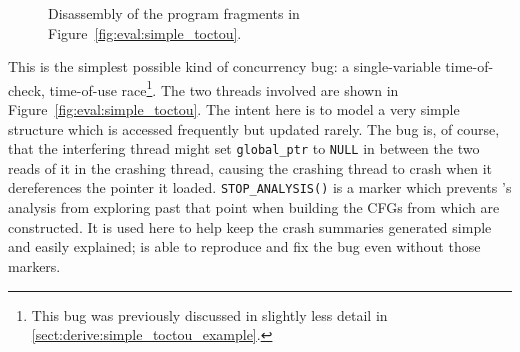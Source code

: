 \begin{figure}
  \hspace{-5mm}
  \caption{Disassembly of the program fragments in Figure~\ref{fig:eval:simple_toctou}.}
  \label{fig:eval:simple_toctou:compiled}
\end{figure}

This is the simplest possible kind of concurrency bug: a
single-variable time-of-check, time-of-use race\footnote{This bug was
  previously discussed in slightly less detail in
  \autoref{sect:derive:simple_toctou_example}.}.  The two threads
involved are shown in Figure~\ref{fig:eval:simple_toctou}.  The intent
here is to model a very simple structure which is accessed frequently
but updated rarely.  The bug is, of course, that the interfering
thread might set \texttt{global\_ptr} to \texttt{NULL} in between the
two reads of it in the crashing thread, causing the crashing thread to
crash when it dereferences the pointer it loaded.
\texttt{STOP\_ANALYSIS()} is a marker which prevents {\technique}'s
analysis from exploring past that point when building the CFGs from
which {\StateMachines} are constructed.  It is used here to help keep
the crash summaries generated simple and easily explained;
{\implementation} is able to reproduce and fix the bug even without
those markers.

